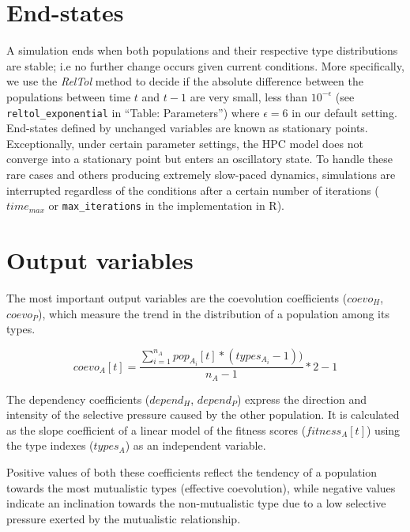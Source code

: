 \documentclass[
]{book}
\begin{document}
\newpage

\hypertarget{end-states}{%
\section*{End-states}\label{end-states}}

A simulation ends when both populations and their respective type distributions are stable; i.e no further change occurs given current conditions. More specifically, we use the \emph{RelTol} method to decide if the absolute difference between the populations between time \(t\) and \(t-1\) are very small, less than \(10^{-\epsilon}\) (see \texttt{reltol\_exponential} in ``Table: Parameters'') where \(\epsilon=6\) in our default setting. End-states defined by unchanged variables are known as stationary points. Exceptionally, under certain parameter settings, the HPC model does not converge into a stationary point but enters an oscillatory state. To handle these rare cases and others producing extremely slow-paced dynamics, simulations are interrupted regardless of the conditions after a certain number of iterations (\(time_{max}\) or \texttt{max\_iterations} in the implementation in R).

\newpage

\hypertarget{output-variables}{%
\section*{Output variables}\label{output-variables}}

The most important output variables are the coevolution coefficients (\(coevo_H\), \(coevo_P\)), which measure the trend in the distribution of a population among its types.

\[coevo_A[t]=\frac{\sum_{i=1}^{n_A}pop_{A_i}[t] * (types_{A_i} - 1))}{n_A - 1} * 2 - 1\]

\begin{flushright}[Eq. 11]\end{flushright}

The dependency coefficients (\(depend_H\), \(depend_P\)) express the direction and intensity of the selective pressure caused by the other population. It is calculated as the slope coefficient of a linear model of the fitness scores (\(fitness_A[t]\)) using the type indexes (\(types_A\)) as an independent variable.

Positive values of both these coefficients reflect the tendency of a population towards the most mutualistic types (effective coevolution), while negative values indicate an inclination towards the non-mutualistic type due to a low selective pressure exerted by the mutualistic relationship.
\end{document}
